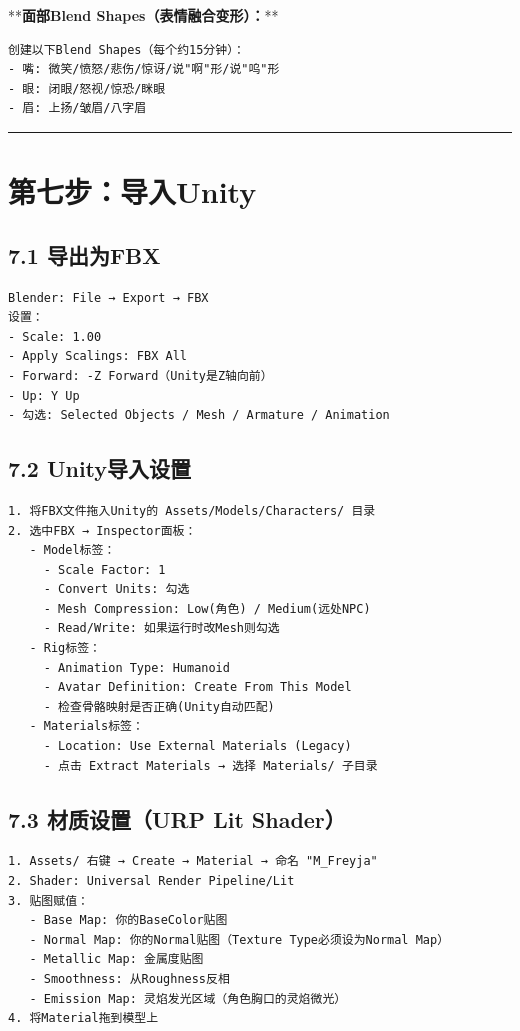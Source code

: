 \documentclass[12pt,a4paper,openany]{ctexbook}
\begin{document}
**\textbf{面部Blend Shapes（表情融合变形）：}**

\begin{verbatim}
创建以下Blend Shapes（每个约15分钟）：
- 嘴: 微笑/愤怒/悲伤/惊讶/说"啊"形/说"呜"形
- 眼: 闭眼/怒视/惊恐/眯眼
- 眉: 上扬/皱眉/八字眉
\end{verbatim}


\bigskip\hrule\bigskip


\section*{第七步：导入Unity}


\subsection*{7.1 导出为FBX}


\begin{verbatim}
Blender: File → Export → FBX
设置：
- Scale: 1.00
- Apply Scalings: FBX All
- Forward: -Z Forward（Unity是Z轴向前）
- Up: Y Up
- 勾选: Selected Objects / Mesh / Armature / Animation
\end{verbatim}


\subsection*{7.2 Unity导入设置}


\begin{verbatim}
1. 将FBX文件拖入Unity的 Assets/Models/Characters/ 目录
2. 选中FBX → Inspector面板：
   - Model标签：
     - Scale Factor: 1
     - Convert Units: 勾选
     - Mesh Compression: Low(角色) / Medium(远处NPC)
     - Read/Write: 如果运行时改Mesh则勾选
   - Rig标签：
     - Animation Type: Humanoid
     - Avatar Definition: Create From This Model
     - 检查骨骼映射是否正确(Unity自动匹配)
   - Materials标签：
     - Location: Use External Materials (Legacy)
     - 点击 Extract Materials → 选择 Materials/ 子目录
\end{verbatim}


\subsection*{7.3 材质设置（URP Lit Shader）}


\begin{verbatim}
1. Assets/ 右键 → Create → Material → 命名 "M_Freyja"
2. Shader: Universal Render Pipeline/Lit
3. 贴图赋值：
   - Base Map: 你的BaseColor贴图
   - Normal Map: 你的Normal贴图（Texture Type必须设为Normal Map）
   - Metallic Map: 金属度贴图
   - Smoothness: 从Roughness反相
   - Emission Map: 灵焰发光区域（角色胸口的灵焰微光）
4. 将Material拖到模型上
\end{verbatim}
\end{document}
